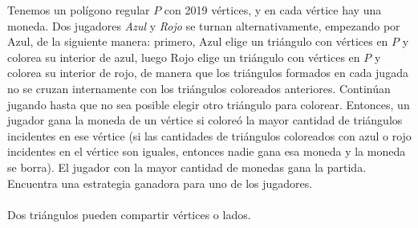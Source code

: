 Tenemos un polígono regular $P$ con 2019 vértices, y en cada vértice hay una moneda. Dos jugadores \textit{Azul} y \textit{Rojo} se turnan alternativamente, empezando por Azul, de la siguiente manera: primero, Azul elige un triángulo con vértices en $P$ y colorea su interior de azul, luego Rojo elige un triángulo con vértices en $P$ y colorea su interior de rojo, de manera que los triángulos formados en cada jugada no se cruzan internamente con los triángulos coloreados anteriores. Continúan jugando hasta que no sea posible elegir otro triángulo para colorear. Entonces, un jugador gana la moneda de un vértice si coloreó la mayor cantidad de triángulos incidentes en ese vértice (si las cantidades de triángulos coloreados con azul o rojo incidentes en el vértice son iguales, entonces nadie gana esa moneda y la moneda se borra). El jugador con la mayor cantidad de monedas gana la partida.  Encuentra una estrategia ganadora para uno de los jugadores. \\\\
 Dos triángulos pueden compartir vértices o lados.
